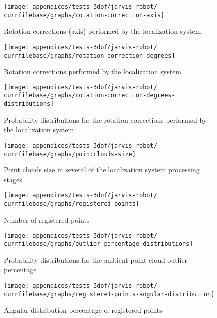 \begin{figure}[H]
	\centering
	\texttt{[image: appendices/tests-3dof/jarvis-robot/\\currfilebase/graphs/rotation-correction-axis]}
	\caption{Rotation corrections (axis) performed by the localization system}
\end{figure}

\begin{figure}[H]
	\centering
	\texttt{[image: appendices/tests-3dof/jarvis-robot/\\currfilebase/graphs/rotation-correction-degrees]}
	\caption{Rotation corrections performed by the localization system}
\end{figure}

\begin{figure}[H]
	\centering
	\texttt{[image: appendices/tests-3dof/jarvis-robot/\\currfilebase/graphs/rotation-correction-degrees-distributions]}
	\caption{Probability distributions for the rotation corrections performed by the localization system}
\end{figure}


\begin{figure}[H]
	\centering
	\texttt{[image: appendices/tests-3dof/jarvis-robot/\\currfilebase/graphs/pointclouds-size]}
	\caption{Point clouds size in several of the localization system processing stages}
\end{figure}

\begin{figure}[H]
	\centering
	\texttt{[image: appendices/tests-3dof/jarvis-robot/\\currfilebase/graphs/registered-points]}
	\caption{Number of registered points}
\end{figure}

\begin{figure}[H]
	\centering
	\texttt{[image: appendices/tests-3dof/jarvis-robot/\\currfilebase/graphs/outlier-percentage-distributions]}
	\caption{Probability distributions for the ambient point cloud outlier percentage}
\end{figure}


\begin{figure}[H]
	\centering
	\texttt{[image: appendices/tests-3dof/jarvis-robot/\\currfilebase/graphs/registered-points-angular-distribution]}
	\caption{Angular distribution percentage of registered points}
\end{figure}

